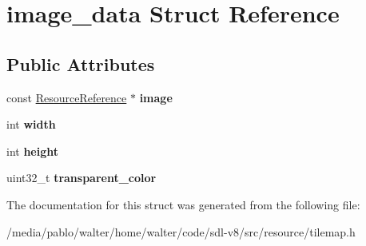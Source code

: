 \hypertarget{structimage__data}{}\section{image\+\_\+data Struct Reference}
\label{structimage__data}
\subsection*{Public Attributes}
\begin{DoxyCompactItemize}
\item 
\mbox{\label{structimage__data_a5ba53713e3b36e3fd769bef81242f7da}} 
const \mbox{\hyperlink{classResourceReference}{Resource\+Reference}} $\ast$ {\bfseries image}
\item 
\mbox{\label{structimage__data_a57d4e845bc285039a0b30dab7552a68d}} 
int {\bfseries width}
\item 
\mbox{\label{structimage__data_ae098f496c8ddf0a25bc5152f9d703ca8}} 
int {\bfseries height}
\item 
\mbox{\label{structimage__data_adadcd18fab18c35d65d8cb2f38ff9916}} 
uint32\+\_\+t {\bfseries transparent\+\_\+color}
\end{DoxyCompactItemize}


The documentation for this struct was generated from the following file\+:\begin{DoxyCompactItemize}
\item 
/media/pablo/walter/home/walter/code/sdl-\/v8/src/resource/tilemap.\+h\end{DoxyCompactItemize}
